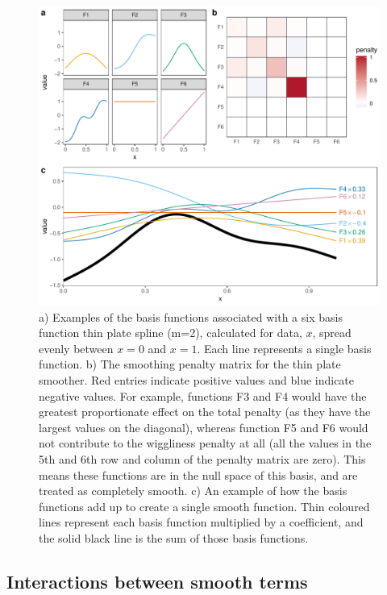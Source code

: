 \documentclass[12pt]{article}
\begin{document}
\begin{figure}
\includegraphics[width=\linewidth]{../figures/basis_function_examples-1} \caption{\label{fig:basis_example}a) Examples of the basis functions associated with a six basis function thin plate spline (m=2), calculated for data, $x$, spread evenly between $x=0$ and $x=1$. Each line represents a single basis function. b) The smoothing  penalty matrix for the thin plate smoother. Red entries indicate positive values and blue indicate negative values.  For example, functions F3 and F4 would have the greatest proportionate effect on the total penalty (as they have the largest values on the diagonal), whereas function F5 and F6 would not contribute to the wiggliness penalty at all (all the values in the 5th and 6th row and column of the penalty matrix are zero). This means these functions are in the null space of this basis, and are treated as completely smooth. c) An example of how the basis functions add up to create a single smooth function. Thin coloured lines represent each basis function multiplied by a coefficient, and the solid black line is the sum of those basis functions.}\label{fig:basis_function_examples}
\end{figure}

\subsection{Interactions between smooth
terms}\label{interactions-between-smooth-terms}
\end{document}
